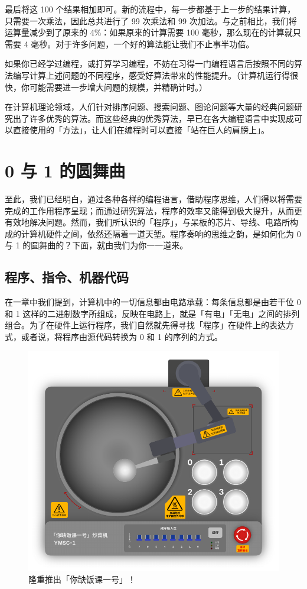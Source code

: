 最后将这 100 个结果相加即可。新的流程中，每一步都基于上一步的结果计算，只需要一次乘法，因此总共进行了 99 次乘法和 99 次加法。与之前相比，我们将运算量减少到了原来的 4\%：如果原来的计算需要 100 毫秒，那么现在的计算就只需要 4 毫秒。对于许多问题，一个好的算法能让我们不止事半功倍。

\begin{note}
  如果你已经学过编程，或打算学习编程，不妨在习得一门编程语言后按照不同的算法编写计算上述问题的不同程序，感受好算法带来的性能提升。（计算机运行得很快，你可能需要进一步增大问题的规模，并精确计时。）
\end{note}

在计算机理论领域，人们针对排序问题、搜索问题、图论问题等大量的经典问题研究出了许多优秀的算法。而这些经典的优秀算法，早已在各大编程语言中实现成可以直接使用的「方法」，让人们在编程时可以直接「站在巨人的肩膀上」。

\section{0 与 1 的圆舞曲}

至此，我们已经明白，通过各种各样的编程语言，借助程序思维，人们得以将需要完成的工作用程序呈现；而通过研究算法，程序的效率又能得到极大提升，从而更有效地解决问题。然而，我们所认识的「程序」，与呆板的芯片、导线、电路所构成的计算机硬件之间，依然还隔着一道天堑。程序奏响的思维之韵，是如何化为 0 与 1 的圆舞曲的？下面，就由我们为你一一道来。

\subsection{程序、指令、机器代码}

在一章中我们提到，计算机中的一切信息都由电路承载：每条信息都是由若干位 0 和 1 这样的二进制数字所组成，反映在电路上，就是「有电」「无电」之间的排列组合。为了在硬件上运行程序，我们自然就先得寻找「程序」在硬件上的表达方式，或者说，将程序由源代码转换为 0 和 1 的序列的方式。

\begin{figure}[htb!]
  \centering
  \includegraphics[width=.65\textwidth]{assets/surpass/YMSC-1.pdf}
  \caption{隆重推出「你缺饭课一号」！}
  \label{fig:YMSC-1}
\end{figure}

